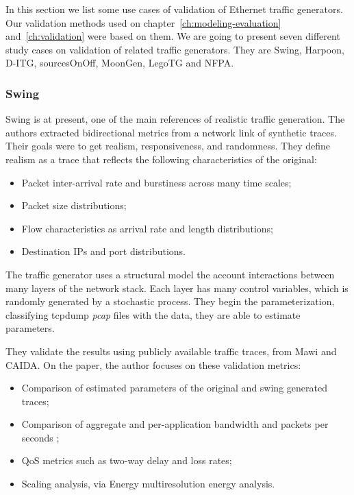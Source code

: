 In this section we list some use cases of validation of Ethernet traffic generators. Our validation methods used on chapter~\ref{ch:modeling-evaluation} and~\ref{ch:validation} were based on them. We are going to present seven different study cases on validation of related traffic generators. They are Swing\cite{swing-paper}, Harpoon\cite{harpoon-paper}, D-ITG\cite{ditg-paper}, sourcesOnOff\cite{sourcesonoff-paper}, MoonGen\cite{moongen-paper}, LegoTG\cite{legotg-paper} and NFPA\cite{nfpa-paper}.



\subsubsection{Swing}
Swing\cite{swing-paper} is at present, one of the main references of realistic traffic generation.  The authors extracted bidirectional metrics from a network link of synthetic traces. Their goals were to get realism, responsiveness, and randomness.  They define realism as a trace that reflects the following characteristics of the original: 

\begin{itemize}
	\item Packet inter-arrival rate and burstiness across many time scales;
	\item Packet size distributions;
	\item Flow characteristics as arrival rate and length distributions;
	\item Destination IPs and port distributions.
\end{itemize}

The traffic generator uses a structural model the account interactions between many layers of the network stack. Each layer has many control variables, which is randomly generated by a stochastic process.  They begin the parameterization, classifying tcpdump\cite{web-libpcap} \textit{pcap}  files with the data, they are able to estimate parameters. 

They validate the results using publicly available traffic traces, from Mawi\cite{web-mawi} and CAIDA\cite{web-caida}. On the paper, the author focuses on these validation metrics:

\begin{itemize}
	\item Comparison of estimated parameters of the original and swing  generated traces;
	\item Comparison of aggregate and per-application bandwidth and packets per seconds ;
	\item QoS metrics such as two-way delay and loss rates;
	\item Scaling analysis, via Energy multiresolution energy analysis.
\end{itemize}



